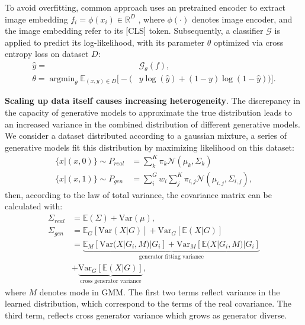     To avoid overfitting, common approach \cite{ojha2023towards, yang2025d3} uses an pretrained encoder to extract image embedding $f_i = \phi(x_i) \in \mathbb{R}^D$ , where $ \phi( \cdot ) $ denotes image encoder, and the image embedding refer to its [CLS] token. Subsequently, a classifier $\mathcal{G}$ is applied to predict its log-likelihood, with its parameter $\theta$ optimized via cross entropy loss on dataset $D$:
    \begin{equation}
    \begin{aligned}
       \hat{y} =  & \mathcal{G}_\theta \left( f \right) ,  \\
       \theta = \mathop{\arg\min}_\theta 
       \mathbb{E}_{(x, y) \in D} \Big[
          - \big( & y \log(\hat{y}) + (1-y)\log(1-\hat{y}) \big)
       \Big].
    \end{aligned}
    \end{equation}

    \textbf{Scaling up data itself causes increasing heterogeneity}. The discrepancy in the capacity of generative models to approximate the true distribution leads to an increased variance in the combined distribution of different generative models. We consider a dataset distributed according to a gaussian mixture, a series of generative models fit this distribution by maximizing likelihood on this dataset: 
    \begin{equation}
        \begin{aligned}
            \{x|(x,0)\} \sim P_{real} &=\sum_{k}^{K}\pi_k \mathcal{N}(\mu_k, \Sigma_k) \\
            \{x|(x,1)\} \sim P_{gen} &=\sum_{i}^{G}w_i\sum_{j}^{K}\pi_{i,j}\mathcal{N}(\mu_{i,j},\Sigma_{i,j}),
        \end{aligned}
    \end{equation}
    then, according to the law of total variance, the covariance matrix can be calculated with:
    \begin{equation}
        \begin{aligned}
            \Sigma_{real} & = \mathbb{E}(\Sigma)+\text{Var}(\mu), \\
            \Sigma_{gen} & = \mathbb{E}_G \left[ \text{Var}(X |G) \right] + \text{Var} _G\left[ \mathbb{E}(X|G)\right] \\
             &  = \underbrace{\mathbb{E}_M \left[ \text{Var}(X|G_i,M)|G_i\right]+\text{Var}_M\left[\mathbb{E}(X|G_i,M)|G_i \right]}_{\text{generator fitting variance}} \\
             & + \underbrace{\text{Var}_G \left[ \mathbb{E}(X|G)\right]}_{\text{cross generator variance}},
        \end{aligned}
    \end{equation}
    where $M$ denotes mode in GMM. The first two terms reflect variance in the learned distribution, which correspond to the terms of the real covariance. The third term, reflects cross generator variance which grows as generator diverse.
    
